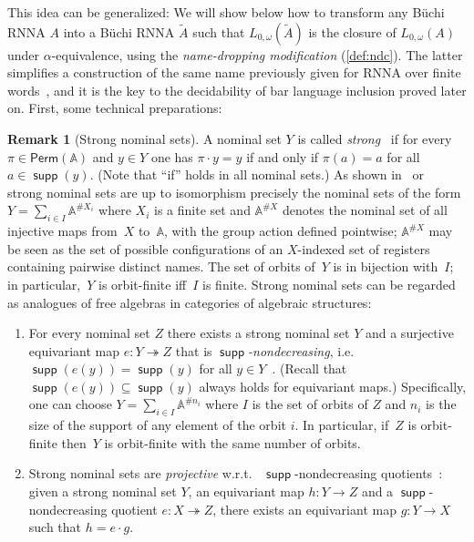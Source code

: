 \documentclass[final,a4paper,UKenglish,thm-restate,autoref,numberwithinsect]{lipics-v2021}
\renewcommand{\o}{\cdot}
\numberwithin{equation}{section}
\newcommand{\epito}{\twoheadrightarrow}
\newcommand{\seq}{\subseteq}
\newcommand{\tl}{\widetilde}
\newcommand{\Perm}{\mathsf{Perm}}
\newcommand{\+}[1]{\mathcal{#1}\xspace}
\newcommand{\names}{\mathbb{A}}
\DeclareMathOperator{\supp}{\mathsf{supp}} %
\theoremstyle{definition}
\newtheorem{rem}[theorem]{Remark}
\begin{document}
This idea can be generalized: We will show below how to transform any
Büchi RNNA $A$ into a Büchi RNNA $\tl{A}$ such that
$L_{0,\omega}(\tl{A})$ is the closure of $L_{0,\omega}(A)$ under
$\alpha$-equivalence, using the \emph{name-dropping modification}
(\autoref{def:ndc}). The latter simplifies a construction of the same
name previously given for RNNA over finite words~\cite{SchroderEA17},
and it is the key to the decidability of bar language inclusion proved
later on. First, some technical preparations:
%
\begin{rem}[Strong nominal sets]\label{rem:strong-nominal-sets}
  A nominal set $Y$ is called \emph{strong}~\cite{tzevelekos08} if for
  every $\pi\in \Perm(\names)$ and $y\in Y$ one has $\pi\o y = y$ if
  and only if $\pi(a)=a$ for all $a\in \supp(y)$. (Note that ``if''
  holds in all nominal sets.) As shown
  in~\cite[Lem.~2.4.2]{petrisan11} or~\cite[Cor.~B.27(2)]{mu19} strong
  nominal sets are up to isomorphism precisely the nominal sets of the
  form $Y=\sum_{i\in I} \names^{\# X_i}$ where $X_i$ is a finite set
  and $\names^{\# X}$ denotes the nominal set of all injective maps
  from~$X$ to~$\names$, with the group action defined pointwise;
  $\names^{\# X}$ may be seen as the set of possible configurations of
  an $X$-indexed set of registers containing pairwise distinct
  names. The set of orbits of~$Y$ is in bijection with~$I$; in
  particular,~$Y$ is orbit-finite iff~$I$ is finite. Strong nominal
  sets can be regarded as analogues of free algebras in categories of
  algebraic structures:
  \begin{enumerate}
  \item For every nominal set $Z$ there exists a strong nominal set $Y$ and a surjective equivariant map $e\colon Y\epito Z$ that is
    \emph{$\supp$-nondecreasing}, i.e.~$\supp(e(y))=\supp(y)$ for all
    $y\in Y$~\cite[Cor.~B.27.1]{mu19}. (Recall that
    $\supp(e(y))\seq \supp(y)$ always holds for equivariant maps.)
    Specifically, one can choose $Y=\sum_{i\in I} \names^{\# n_i}$
    where $I$ is the set of orbits of $Z$ and $n_i$ is the size of the
    support of any element of the orbit $i$. In particular, if~$Z$ is
    orbit-finite then~$Y$ is orbit-finite with the same number of
    orbits.
  
  \item Strong nominal sets are \emph{projective} w.r.t.~%
    $\supp$-nondecreasing quotients~\cite[Lem.~B.28]{mu19}: given a
    strong nominal set $Y$, an equivariant map $h\colon Y\to Z$ and a
    $\supp$-nondecreasing quotient $e\colon X\epito Z$,
    there exists an equivariant map $g\colon Y\to X$ such that
    $h=e\o g$.
  \end{enumerate}
\end{rem}
\end{document}
